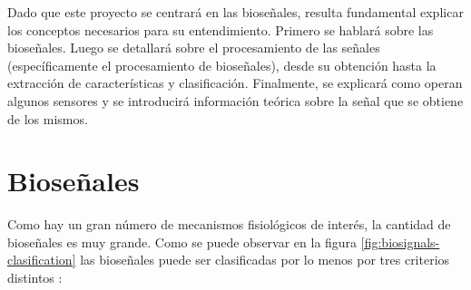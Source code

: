 Dado que este proyecto se centrará en las bioseñales, resulta fundamental explicar los conceptos necesarios para su entendimiento. Primero se hablará sobre las bioseñales. Luego se detallará sobre el procesamiento de las señales (específicamente el procesamiento de bioseñales), desde su obtención hasta la extracción de características y clasificación. Finalmente, se explicará como operan algunos sensores y se introducirá información teórica sobre la señal que se obtiene de los mismos.

\section{Bioseñales}\label{sec:biosignals}

Como hay un gran número de mecanismos fisiológicos de interés, la cantidad de bioseñales es muy grande. Como se puede observar en la figura \ref{fig:biosignals-clasification} las bioseñales puede ser clasificadas por lo menos por tres criterios distintos \cite{biosignal-book-2}: 

